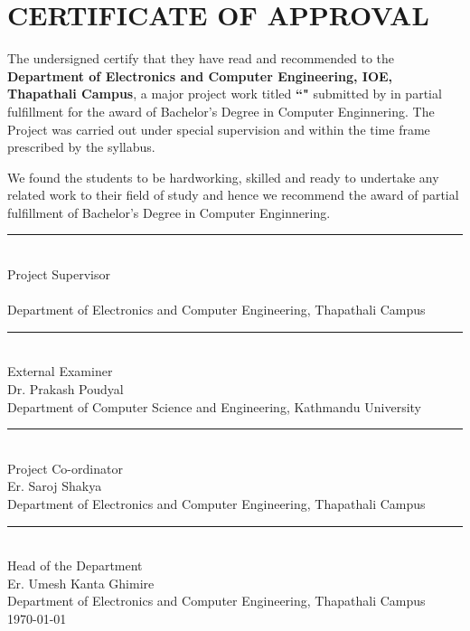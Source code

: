 \section*{CERTIFICATE OF APPROVAL}
    The undersigned certify that they have read and recommended to the \textbf{Department of Electronics and Computer Engineering, IOE, Thapathali Campus}, a major project work titled \textbf{``\titlename"} submitted by \textbf{\authornames} in partial fulfillment for the award of Bachelor's Degree in Computer Enginnering. The Project was carried out under special supervision and within the time frame prescribed by the syllabus.
    
    We found the students to be hardworking, skilled and ready to undertake any related work to their field of study and hence we recommend the award of partial fulfillment of Bachelor's Degree in Computer Enginnering.\\
    
    \rule{0.5\linewidth}{0.4pt}\\
    Project Supervisor\\
    \supervisorname\\
    Department of Electronics and Computer Engineering, Thapathali Campus\\

    \rule{0.5\linewidth}{0.4pt} \\
    External Examiner \\
    Dr. Prakash Poudyal \\
    Department of Computer Science and Engineering, Kathmandu University\\

    \rule{0.5\linewidth}{0.4pt} \\
    Project Co-ordinator\\
    Er. Saroj Shakya \\
    Department of Electronics and Computer Engineering, Thapathali Campus\\

    \rule{0.5\linewidth}{0.4pt} \\
    Head of the Department \\ 
    Er. Umesh Kanta Ghimire \\
    Department of Electronics and Computer Engineering, Thapathali Campus\\

    \today

    \pagebreak


